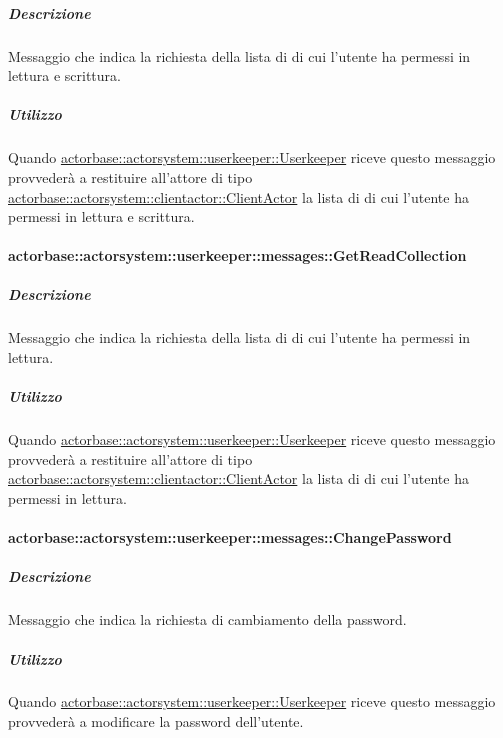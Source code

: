 \documentclass{scalatekids-article}
\begin{document}
\subparagraph{Descrizione}

Messaggio che indica la richiesta della lista di  di cui
l'utente ha  permessi in lettura e scrittura.

\subparagraph{Utilizzo}

Quando \hyperref[sec:actorbase::actorsystem::userkeeper::Userkeeper]{actorbase::\allowbreak{}actorsystem::\allowbreak{}userkeeper::\allowbreak{}Userkeeper}
riceve questo messaggio provvederà a restituire all'attore di tipo
\hyperref[sec:actorbase::actorsystem::clientactor::ClientActor]{actorbase::\allowbreak{}actorsystem::\allowbreak{}clientactor::\allowbreak{}ClientActor}
la lista di  di cui l'utente ha permessi in lettura
e scrittura.

\paragraph{actorbase::actorsystem::userkeeper::messages::GetReadCollection}
\label{sec:actorbase::actorsystem::userkeeper::messages::GetReadCollection}

\subparagraph{Descrizione}

Messaggio che indica la richiesta della lista di  di cui
l'utente ha  permessi in lettura.

\subparagraph{Utilizzo}

Quando \hyperref[sec:actorbase::actorsystem::userkeeper::Userkeeper]{actorbase::\allowbreak{}actorsystem::\allowbreak{}userkeeper::\allowbreak{}Userkeeper}
riceve questo messaggio provvederà a restituire all'attore di tipo
\hyperref[sec:actorbase::actorsystem::clientactor::ClientActor]{actorbase::\allowbreak{}actorsystem::\allowbreak{}clientactor::\allowbreak{}ClientActor}
la lista di  di cui l'utente ha permessi in lettura.

\paragraph{actorbase::actorsystem::userkeeper::messages::ChangePassword}
\label{sec:actorbase::actorsystem::userkeeper::messages::ChangePassword}

\subparagraph{Descrizione}

Messaggio che indica la richiesta di cambiamento della password.

\subparagraph{Utilizzo}

Quando \hyperref[sec:actorbase::actorsystem::userkeeper::Userkeeper]{actorbase::\allowbreak{}actorsystem::\allowbreak{}userkeeper::\allowbreak{}Userkeeper}
riceve questo messaggio provvederà a modificare la password dell'utente.
\end{document}
